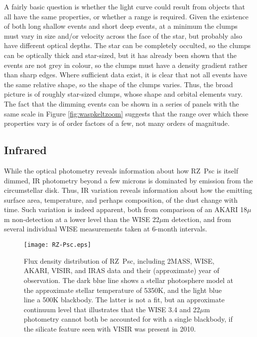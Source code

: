 \documentclass[]{rsos}
\begin{document}
A fairly basic question is whether the light curve could result from objects that all
have the same properties, or whether a range is required. Given the existence of both
long shallow events and short deep events, at a minimum the clumps must vary in size
and/or velocity across the face of the star, but probably also have different optical
depths. The star can be completely occulted, so the clumps can be optically thick and
star-sized, but it has already been shown that the events are not grey in colour, so the
clumps must have a density gradient rather than sharp edges. Where sufficient data exist,
it is clear that not all events have the same relative shape, so the shape of the clumps
varies. Thus, the broad picture is of roughly star-sized clumps, whose shape and orbital
elements vary. The fact that the dimming events can be shown in a series of panels with
the same scale in Figure \ref{fig:waspkeltzoom} suggests that the range over which these
properties vary is of order factors of a few, not many orders of magnitude.

\subsection{Infrared}\label{ss:irvar}

While the optical photometry reveals information about how RZ~Psc is itself dimmed, IR
photometry beyond a few microns is dominated by emission from the circumstellar
disk. Thus, IR variation reveals information about how the emitting surface area,
temperature, and perhaps composition, of the dust change with time. Such variation is
indeed apparent, both from comparison of an AKARI 18$\mu$m non-detection at a lower level
than the WISE 22$\mu$m detection, and from several individual WISE measurements taken at
6-month intervals.

\begin{figure*}
  \begin{center}
    \hspace{-0.5cm} \texttt{[image: RZ-Psc.eps]}
    \caption{Flux density distribution of RZ~Psc, including 2MASS, WISE, AKARI, VISIR,
      and IRAS data and their (approximate) year of observation. The dark blue line shows
      a stellar photosphere model at the approximate stellar temperature of 5350K, and
      the light blue line a 500K blackbody. The latter is not a fit, but an approximate
      continuum level that illustrates that the WISE 3.4 and 22$\mu$m photometry cannot
      both be accounted for with a single blackbody, if the silicate feature seen with
      VISIR was present in 2010.}\label{fig:sed}
  \end{center}
\end{figure*}
\end{document}
